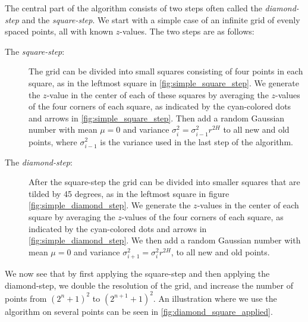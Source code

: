 The central part of the algorithm consists of two steps often called the \emph{diamond-step} and the \emph{square-step}. We start with a simple case of an infinite grid of evenly spaced points, all with known $z$-values. The two steps are as follows:
\begin{description}
    \item[The \emph{square-step}:] The grid can be divided into small squares consisting of four points in each square, as in the leftmost square in \cref{fig:simple_square_step}. We generate the $z$-value in the center of each of these squares by averaging the $z$-values of the four corners of each square, as indicated by the cyan-colored dots and arrows in \cref{fig:simple_square_step}. Then add a random Gaussian number with mean $\mu = 0$ and variance $\sigma_i^2 = \sigma_{i-1}^2r^{2H}$ to all new and old points, where $\sigma_{i-1}^2$ is the variance used in the last step of the algorithm.
    \label{enum:test}
    
    \item[The \emph{diamond-step}:] After the square-step the grid can be divided into smaller squares that are tilded by 45 degrees, as in the leftmost square in figure \cref{fig:simple_diamond_step}. We generate the $z$-values in the center of each square by averaging the $z$-values of the four corners of each square, as indicated by the cyan-colored dots and arrows in \cref{fig:simple_diamond_step}. We then add a random Gaussian number with mean $\mu = 0$ and variance $\sigma_{i+1}^2 = \sigma_i^2r^{2H}$, to all new and old points. 
\end{description}
We now see that by first applying the square-step and then applying the diamond-step, we double the resolution of the grid, and increase the number of points from $(2^n+1)^2$ to $(2^{n+1}+1)^2$. An illustration where we use the algorithm on several points can be seen in \cref{fig:diamond_square_applied}.


